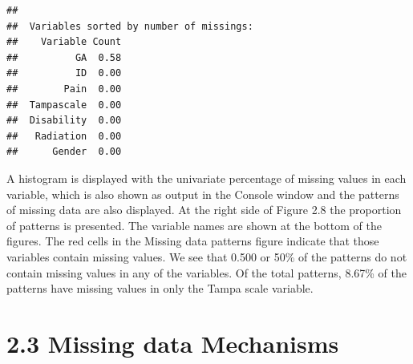 \documentclass[]{book}
\theoremstyle{definition}
\theoremstyle{definition}
\theoremstyle{definition}
\theoremstyle{remark}
\begin{document}
\begin{verbatim}
## 
##  Variables sorted by number of missings: 
##    Variable Count
##          GA  0.58
##          ID  0.00
##        Pain  0.00
##  Tampascale  0.00
##  Disability  0.00
##   Radiation  0.00
##      Gender  0.00
\end{verbatim}

A histogram is displayed with the univariate percentage of missing
values in each variable, which is also shown as output in the Console
window and the patterns of missing data are also displayed. At the right
side of Figure 2.8 the proportion of patterns is presented. The variable
names are shown at the bottom of the figures. The red cells in the
Missing data patterns figure indicate that those variables contain
missing values. We see that 0.500 or 50\% of the patterns do not contain
missing values in any of the variables. Of the total patterns, 8.67\% of
the patterns have missing values in only the Tampa scale variable.

\section{2.3 Missing data Mechanisms}\label{missing-data-mechanisms}
\end{document}
